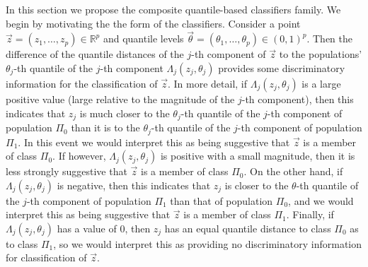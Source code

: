 In this section we propose the composite quantile-based classifiers family.  We
begin by motivating the the form of the classifiers.  Consider a point
$\vec{z} = (z_1, \dots, z_p) \in \mathbb{R}^p$ and quantile levels
$\vec{\theta} = (\theta_1, \dots, \theta_p) \in (0, 1)^p$.  Then the difference
of the quantile distances of the $j$-th component of $\vec{z}$ to the
populations' $\theta_j$-th quantile of the $j$-th component
$\Lambda_j(z_j, \theta_j)$ provides some discriminatory information for the
classification of $\vec{z}$.  In more detail, if $\Lambda_j(z_j, \theta_j)$ is a
large positive value (large relative to the magnitude of the $j$-th component),
then this indicates that $z_j$ is much closer to the $\theta_j$-th quantile of
the $j$-th component of population $\Pi_0$ than it is to the $\theta_j$-th
quantile of the $j$-th component of population $\Pi_1$.  In this event we would
interpret this as being suggestive that $\vec{z}$ is a member of class $\Pi_0$.
If however, $\Lambda_j(z_j, \theta_j)$ is positive with a small magnitude, then
it is less strongly suggestive that $\vec{z}$ is a member of class $\Pi_0$.  On
the other hand, if $\Lambda_j(z_j, \theta_j)$ is negative, then this indicates
that $z_j$ is closer to the $\theta$-th quantile of the $j$-th component of
population $\Pi_1$ than that of population $\Pi_0$, and we would interpret this
as being suggestive that $\vec{z}$ is a member of class $\Pi_1$.  Finally, if
$\Lambda_j(z_j, \theta_j)$ has a value of 0, then $z_j$ has an equal quantile
distance to class $\Pi_0$ as to class $\Pi_1$, so we would interpret this as
providing no discriminatory information for classification of $\vec{z}$.

